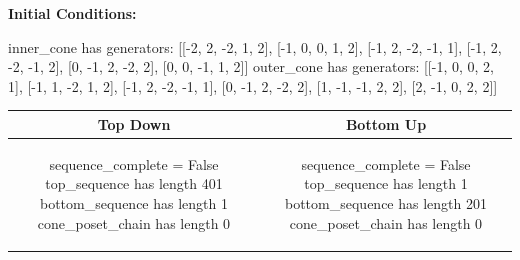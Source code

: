 \documentclass[10pt]{article}
\begin{document}
\textbf{Initial Conditions:}
\begin{SAGE}
inner_cone has generators: 
[[-2, 2, -2, 1, 2], [-1, 0, 0, 1, 2], [-1, 2, -2, -1, 1], [-1, 2, -2, -1, 2], [0, -1, 2, -2, 2], [0, 0, -1, 1, 2]]
outer_cone has generators: 
[[-1, 0, 0, 2, 1], [-1, 1, -2, 1, 2], [-1, 2, -2, -1, 1], [0, -1, 2, -2, 2], [1, -1, -1, 2, 2], [2, -1, 0, 2, 2]]

\end{SAGE}
\begin{tabular}{c|c}
\textbf{Top Down} & \textbf{Bottom Up} \\ \hline  
\begin{SAGE}
sequence_complete = False
top_sequence has length 401
bottom_sequence has length 1
cone_poset_chain has length 0
\end{SAGE} 
&
\begin{SAGE}
sequence_complete = False
top_sequence has length 1
bottom_sequence has length 201
cone_poset_chain has length 0
\end{SAGE} 
\\ \hline


\end{tabular}
\end{document}
